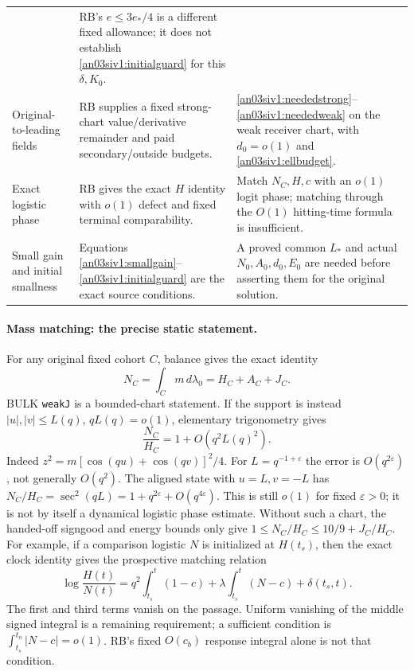 \documentclass[11pt]{article}
\numberwithin{equation}{section}
\theoremstyle{remark}\newtheorem{remark}[proposition]{Remark}
\newcommand{\dd}{\,d}\newcommand{\E}{\mathbb E}
\newcommand{\eps}{\varepsilon}
\begin{document}
\begin{longtable}{>{\raggedright\arraybackslash}p{}
 >{\raggedright\arraybackslash}p{}
 >{\raggedright\arraybackslash}p{}}
& RB's $e\le3e_*/4$ is a different fixed allowance; it does not
establish \eqref{an03siv1:initialguard} for this $\delta,K_0$.\\[4pt]
Original-to-leading fields & RB supplies a fixed strong-chart
value/derivative remainder and paid secondary/outside budgets.
& \eqref{an03siv1:neededstrong}--\eqref{an03siv1:neededweak} on the
weak receiver chart, with $d_0=o(1)$ and
\eqref{an03siv1:ellbudget}.\\[4pt]
Exact logistic phase & RB gives the exact $H$ identity with $o(1)$
defect and fixed terminal comparability. & Match $N_C,H,c$ with
an $o(1)$ logit phase; matching through the $O(1)$ hitting-time
formula is insufficient.\\[4pt]
Small gain and initial smallness & Equations
\eqref{an03siv1:smallgain}--\eqref{an03siv1:initialguard} are the exact
source conditions. & A proved common $L_*$ and actual $N_0,A_0,d_0,E_0$
are needed before asserting them for the original solution.\\
\bottomrule
\end{longtable}

\paragraph{Mass matching: the precise static statement.}
For any original fixed cohort $C$, balance gives the exact identity
\begin{equation}
 N_C=\int_Cm\dd\lambda_0=H_C+A_C+J_C.
 \label{an03siv1:massidentity}
\end{equation}
BULK \texttt{weakJ} is a bounded-chart statement. If the support
is instead $|u|,|v|\le L(q)$, $qL(q)=o(1)$, elementary
trigonometry gives
\begin{equation}
 \frac{N_C}{H_C}=1+O(q^2L(q)^2).
 \label{an03siv1:growingmass}
\end{equation}
Indeed $z^2=m[\cos(qu)+\cos(qv)]^2/4$.
For $L=q^{-1+\eps}$ the error is $O(q^{2\eps})$, not
generally $O(q^2)$. The aligned state with $u=L,v=-L$ has
$N_C/H_C=\sec^2(qL)=1+q^{2\eps}+O(q^{4\eps})$.
This is still $o(1)$ for fixed $\eps>0$; it is not by itself
a dynamical logistic phase estimate. Without such a chart, the
handed-off signgood and energy bounds only give
$1\le N_C/H_C\le10/9+J_C/H_C$.
For example, if a comparison logistic $N$ is initialized at $H(t_s)$,
then the exact clock identity gives the prospective matching relation
\begin{equation}
 \log\frac{H(t)}{N(t)}
 =q^2\int_{t_s}^t(1-c)+\lambda\int_{t_s}^t(N-c)
                         +\delta(t_s,t).
 \label{an03siv1:phaseneeded}
\end{equation}
The first and third terms vanish on the passage. Uniform vanishing
of the middle signed integral is a remaining requirement; a
sufficient condition is $\int_{t_s}^{t_n}|N-c|=o(1)$.
RB's fixed $O(c_b)$ response integral alone is not that condition.
\end{document}
